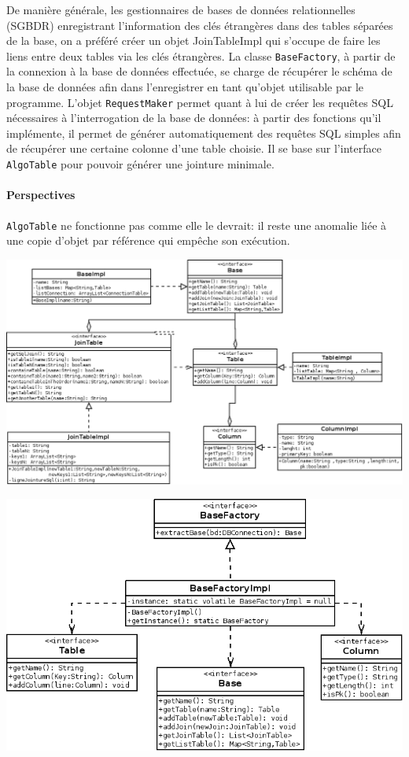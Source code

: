 \documentclass[12pt]{report}
\begin{document}
    De manière générale, les gestionnaires de bases de données relationnelles (SGBDR) enregistrant l'information des clés étrangères dans des tables séparées de la base, on a préféré créer un objet JoinTableImpl qui s'occupe de faire les liens entre deux tables via les clés étrangères.
    La classe \texttt{BaseFactory}, à partir de la connexion à la base de données effectuée, se charge de récupérer le schéma de la base de données afin dans l'enregistrer en tant qu'objet utilisable par le programme.
    L'objet \texttt{RequestMaker} permet quant à lui de créer les requêtes SQL nécessaires à l'interrogation de la base de données: à partir des fonctions qu'il implémente, il permet de générer automatiquement des requêtes SQL simples afin de récupérer une certaine colonne d'une table choisie. Il se base sur l'interface \texttt{AlgoTable} pour pouvoir générer une jointure minimale.

\paragraph{Perspectives}

    \texttt{AlgoTable} ne fonctionne pas comme elle le devrait: il reste une anomalie liée à une copie d'objet par référence qui empêche son exécution.

\bigskip

\includegraphics[scale=0.43]{bduml/structDataBase.png}

\includegraphics[scale=0.5]{bduml/baseFactory.png}
\end{document}
